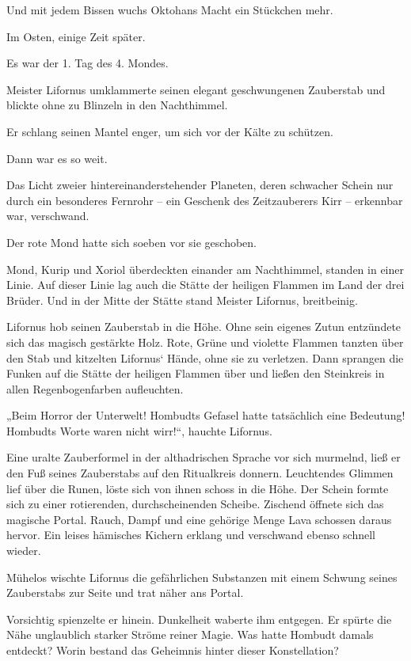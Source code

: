 Und mit jedem Bissen wuchs Oktohans Macht ein Stückchen mehr.






Im Osten, einige Zeit später.\bigskip



Es war der 1. Tag des 4. Mondes.

Meister Lifornus umklammerte seinen elegant geschwungenen Zauberstab und blickte ohne zu Blinzeln in den Nachthimmel.

Er schlang seinen Mantel enger, um sich vor der Kälte zu schützen.

Dann war es so weit.

Das Licht zweier hintereinanderstehender Planeten, deren schwacher Schein nur durch ein besonderes Fernrohr – ein Geschenk des Zeitzauberers Kirr – erkennbar war, verschwand.

Der rote Mond hatte sich soeben vor sie geschoben.

Mond, Kurip und Xoriol überdeckten einander am Nachthimmel, standen in einer Linie. Auf dieser Linie lag auch die Stätte der heiligen Flammen im Land der drei Brüder. Und in der Mitte der Stätte stand Meister Lifornus, breitbeinig.

Lifornus hob seinen Zauberstab in die Höhe. Ohne sein eigenes Zutun entzündete sich das magisch gestärkte Holz. Rote, Grüne und violette Flammen tanzten über den Stab und kitzelten Lifornus‘ Hände, ohne sie zu verletzen. Dann sprangen die Funken auf die Stätte der heiligen Flammen über und ließen den Steinkreis in allen Regenbogenfarben aufleuchten.

„Beim Horror der Unterwelt! Hombudts Gefasel hatte tatsächlich eine Bedeutung! Hombudts Worte waren nicht wirr!“, hauchte Lifornus.

Eine uralte Zauberformel in der althadrischen Sprache vor sich murmelnd, ließ er den Fuß seines Zauberstabs auf den Ritualkreis donnern. Leuchtendes Glimmen lief über die Runen, löste sich von ihnen schoss in die Höhe. Der Schein formte sich zu einer rotierenden, durchscheinenden Scheibe. Zischend öffnete sich das magische Portal. Rauch, Dampf und eine gehörige Menge Lava schossen daraus hervor. Ein leises hämisches Kichern erklang und verschwand ebenso schnell wieder.

Mühelos wischte Lifornus die gefährlichen Substanzen mit einem Schwung seines Zauberstabs zur Seite und trat näher ans Portal.

Vorsichtig spienzelte er hinein. Dunkelheit waberte ihm entgegen. Er spürte die Nähe unglaublich starker Ströme reiner Magie. Was hatte Hombudt damals entdeckt? Worin bestand das Geheimnis hinter dieser Konstellation?

